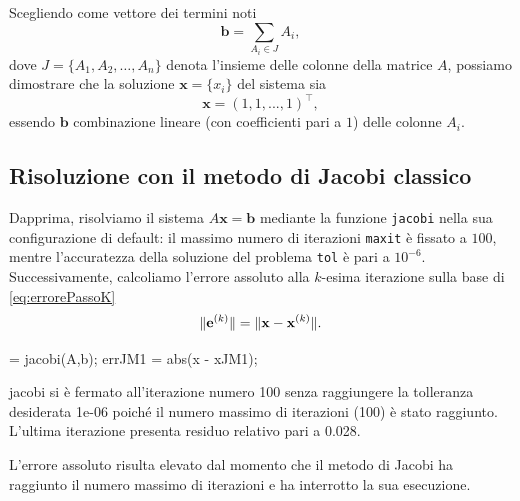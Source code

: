 Scegliendo come vettore dei termini noti
\begin{equation*}
    \mathbf{b} = \sum_ {A_{i} \in J} A_{i},
\end{equation*}
dove $J = \{A_{1}, A_{2},\dots,A_{n}\}$ denota l'insieme delle colonne della matrice $A$, possiamo dimostrare che la soluzione $\mathbf{x}=\{{x}_{i}\}$ 
del sistema sia
\begin{equation*}
    \mathbf{x} = (1, 1, ..., 1)^\top,
\end{equation*}
essendo $\mathbf{b}$ combinazione lineare (con coefficienti pari a $\num{1}$) delle colonne $A_{i}$.
\subsection{Risoluzione con il metodo di Jacobi classico}
Dapprima, risolviamo il sistema $A\mathbf{x}=\mathbf{b}$ mediante la funzione \lstinline{jacobi} nella sua configurazione di default:
il massimo numero di iterazioni \lstinline{maxit} \`e fissato a $\num{100}$, mentre l'accuratezza della soluzione del problema \lstinline{tol} \`e pari a ${10}^{-6}$.\newline
Successivamente, calcoliamo l'errore assoluto alla $k$-esima iterazione sulla base di \eqref{eq:errorePassoK}
\begin{equation*}
\lVert\mathbf{e}^{(k)}\rVert = \lVert\mathbf{x} - \mathbf{x}^{(k)}\rVert.
\end{equation*}
\begin{matlabcode}
     = jacobi(A,b);
    errJM1 = abs(x - xJM1);
\end{matlabcode}
\begin{matlaboutput}
    jacobi si è fermato all'iterazione numero 100 senza
    raggiungere la tolleranza desiderata 1e-06 poiché il
    numero massimo di iterazioni (100) è stato raggiunto.
    L'ultima iterazione presenta residuo relativo 
    pari a 0.028.
\end{matlaboutput}
L'errore assoluto risulta elevato dal momento che il metodo di Jacobi ha raggiunto il numero massimo di iterazioni e ha interrotto la sua esecuzione.

